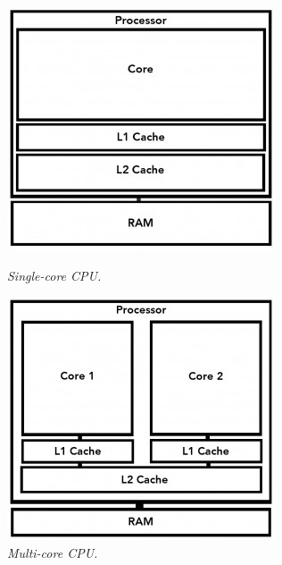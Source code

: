 \documentclass[12pt]{article}
\begin{document}
\begin{figure}[h!]
  \centering
  \begin{minipage}[h!]{0.4\textwidth}
    \includegraphics[width=\textwidth]{Pictures/single_core.png}
    \caption{\textit{\color{gray}Single-core CPU.\cite{Looper}}}
  \end{minipage}
  \hfill
  \begin{minipage}[h!]{0.4\textwidth}
    \includegraphics[width=\textwidth]{Pictures/multi_core.png}
    \caption{\textit{\color{gray}Multi-core CPU.\cite{Looper}}}
  \end{minipage}
\end{figure}
\end{document}
